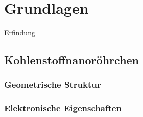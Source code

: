 \chapter{Grundlagen}
\label{cha:grundlagen}
Erfindung

\section{Kohlenstoffnanoröhrchen}
\label{cha:kohlenstoffnanoroehrchen}

\subsection{Geometrische Struktur}
\label{geometrischestruktur}

\subsection{Elektronische Eigenschaften}
\label{elektronischeeigenschaften}